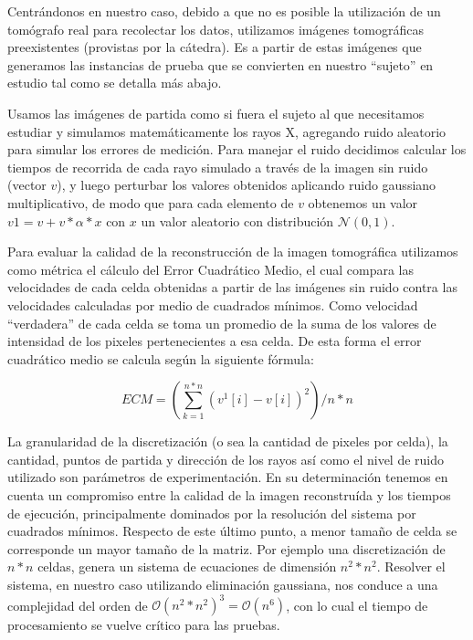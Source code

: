 \par Centrándonos en nuestro caso, debido a que no es posible la utilización de un tomógrafo real para recolectar los datos, utilizamos imágenes tomográficas preexistentes (provistas por la cátedra). Es a partir de estas imágenes que generamos las instancias de prueba que se convierten en nuestro “sujeto” en estudio tal como se detalla más abajo.

\par Usamos las imágenes de partida como si fuera el sujeto al que necesitamos estudiar y simulamos matemáticamente los rayos X, agregando ruido aleatorio para simular los errores de medición. Para manejar el ruido decidimos calcular los tiempos de recorrida de cada rayo simulado a través de la imagen sin ruido (vector $v$), y luego perturbar los valores obtenidos aplicando ruido gaussiano multiplicativo, de modo que para cada elemento de $v$ obtenemos un valor $v{1}= v + v * \alpha * x$ con $x$ un valor aleatorio con distribución $\mathcal{N} (0,1)$.

\par Para evaluar la calidad de la reconstrucción de la imagen tomográfica utilizamos como métrica el cálculo del Error Cuadrático Medio, el cual compara las velocidades de cada celda obtenidas a partir de las imágenes sin ruido contra las velocidades calculadas por medio de cuadrados mínimos. Como velocidad “verdadera” de cada celda se toma un promedio de la suma de los valores de intensidad de los pixeles pertenecientes a esa celda. De esta forma el error cuadrático medio se calcula según la siguiente fórmula:

\begin{displaymath}
ECM =(\sum_{k=1}^{n*n} (v^{1}[i] - v[i])^{2})/n*n
\end{displaymath}


\par La granularidad de la discretización (o sea la cantidad de pixeles por celda), la cantidad, puntos de partida y dirección de los rayos así como el nivel de ruido utilizado son parámetros de experimentación. En su determinación tenemos en cuenta un compromiso entre la calidad de la imagen reconstruída y los tiempos de ejecución, principalmente dominados por la resolución del sistema por cuadrados mínimos. Respecto de este último punto, a menor tamaño de celda se corresponde un mayor tamaño de la matriz. Por ejemplo una discretización de $n*n$ celdas, genera un sistema de ecuaciones de dimensión $n^{2}*n^{2}$. Resolver el sistema, en  nuestro caso utilizando eliminación gaussiana, nos conduce a una complejidad del orden de $\mathcal{O} (n^{2}*n^{2})^3 = \mathcal{O} (n^{6})$, con lo cual el tiempo de procesamiento se vuelve crítico para las pruebas.
